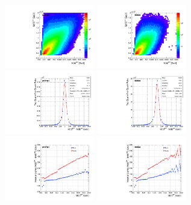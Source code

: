 \begin{figure}
  \begin{center}
    \includegraphics[width=0.35\textwidth]{fig_fullRun2UL/KinRecoResolutions/ttbar_mass_genreco_prompt.pdf}
    \includegraphics[width=0.35\textwidth]{fig_fullRun2UL/KinRecoResolutions/ttbar_mass_genreco_viatau.pdf}\\
    \includegraphics[width=0.35\textwidth]{fig_fullRun2UL/KinRecoResolutions/ttbar_mass_residual_prompt.pdf}
    \includegraphics[width=0.35\textwidth]{fig_fullRun2UL/KinRecoResolutions/ttbar_mass_residual_viatau.pdf}\\
    \includegraphics[width=0.35\textwidth]{fig_fullRun2UL/KinRecoResolutions/ttbar_mass_multiresidual_prompt.pdf}
    \includegraphics[width=0.35\textwidth]{fig_fullRun2UL/KinRecoResolutions/ttbar_mass_multiresidual_viatau.pdf}\\

\end{center}
\end{figure}
